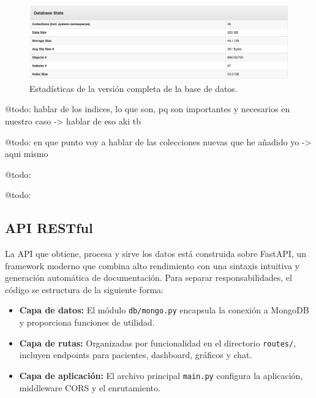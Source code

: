 \begin{figure}[H]
    \centering
    \includegraphics[width=1\textwidth]{imagenes/stats_full.png}
    \caption{Estadísticas de la versión completa de la base de datos.}
    \label{fig:stats_full}
\end{figure}


@todo: hablar de los indices, lo que son, pq son importantes y necesarios en nuestro caso -> hablar de eso aki tb 

@todo: en que punto voy a hablar de las colecciones nuevas que he añadido yo -> aqui mismo 

@todo:

@todo:






\subsection{API RESTful}

La API que obtiene, procesa y sirve los datos está construida sobre FastAPI, un framework moderno que combina alto rendimiento con una sintaxis intuitiva y generación automática de documentación. Para separar responsabilidades, el código se estructura de la siguiente forma:

\begin{itemize}
\item \textbf{Capa de datos:} El módulo \texttt{db/mongo.py} encapsula la conexión a MongoDB y proporciona funciones de utilidad.
\item \textbf{Capa de rutas:} Organizadas por funcionalidad en el directorio \texttt{routes/}, incluyen endpoints para pacientes, dashboard, gráficos y chat.
\item \textbf{Capa de aplicación:} El archivo principal \texttt{main.py} configura la aplicación, middleware CORS y el enrutamiento.
\end{itemize}

